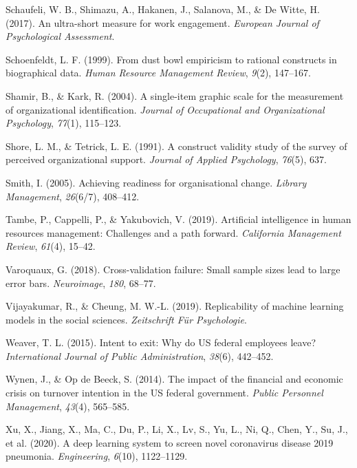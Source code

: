 \documentclass[
  jou]{apa6}
\newlength{\cslhangindent}
\newlength{\cslentryspacingunit} %
\newenvironment{CSLReferences}[2] %
 {%
  \setlength{\parindent}{0pt}
  \ifodd #1
  \let\oldpar\par
  \def\par{\hangindent=\cslhangindent\oldpar}
  \fi
  \setlength{\parskip}{#2\cslentryspacingunit}
 }%
 {}
\begin{document}
\begin{CSLReferences}{1}{0}
\leavevmode{}%
Schaufeli, W. B., Shimazu, A., Hakanen, J., Salanova, M., \& De Witte, H. (2017). An ultra-short measure for work engagement. \emph{European Journal of Psychological Assessment}.

\leavevmode{}%
Schoenfeldt, L. F. (1999). From dust bowl empiricism to rational constructs in biographical data. \emph{Human Resource Management Review}, \emph{9}(2), 147--167.

\leavevmode{}%
Shamir, B., \& Kark, R. (2004). A single-item graphic scale for the measurement of organizational identification. \emph{Journal of Occupational and Organizational Psychology}, \emph{77}(1), 115--123.

\leavevmode{}%
Shore, L. M., \& Tetrick, L. E. (1991). A construct validity study of the survey of perceived organizational support. \emph{Journal of Applied Psychology}, \emph{76}(5), 637.

\leavevmode{}%
Smith, I. (2005). Achieving readiness for organisational change. \emph{Library Management}, \emph{26}(6/7), 408--412.

\leavevmode{}%
Tambe, P., Cappelli, P., \& Yakubovich, V. (2019). Artificial intelligence in human resources management: Challenges and a path forward. \emph{California Management Review}, \emph{61}(4), 15--42.

\leavevmode{}%
Varoquaux, G. (2018). Cross-validation failure: Small sample sizes lead to large error bars. \emph{Neuroimage}, \emph{180}, 68--77.

\leavevmode{}%
Vijayakumar, R., \& Cheung, M. W.-L. (2019). Replicability of machine learning models in the social sciences. \emph{Zeitschrift F{ü}r Psychologie}.

\leavevmode{}%
Weaver, T. L. (2015). Intent to exit: Why do US federal employees leave? \emph{International Journal of Public Administration}, \emph{38}(6), 442--452.

\leavevmode{}%
Wynen, J., \& Op de Beeck, S. (2014). The impact of the financial and economic crisis on turnover intention in the US federal government. \emph{Public Personnel Management}, \emph{43}(4), 565--585.

\leavevmode{}%
Xu, X., Jiang, X., Ma, C., Du, P., Li, X., Lv, S., Yu, L., Ni, Q., Chen, Y., Su, J., et al. (2020). A deep learning system to screen novel coronavirus disease 2019 pneumonia. \emph{Engineering}, \emph{6}(10), 1122--1129.

\end{CSLReferences}
\end{document}
